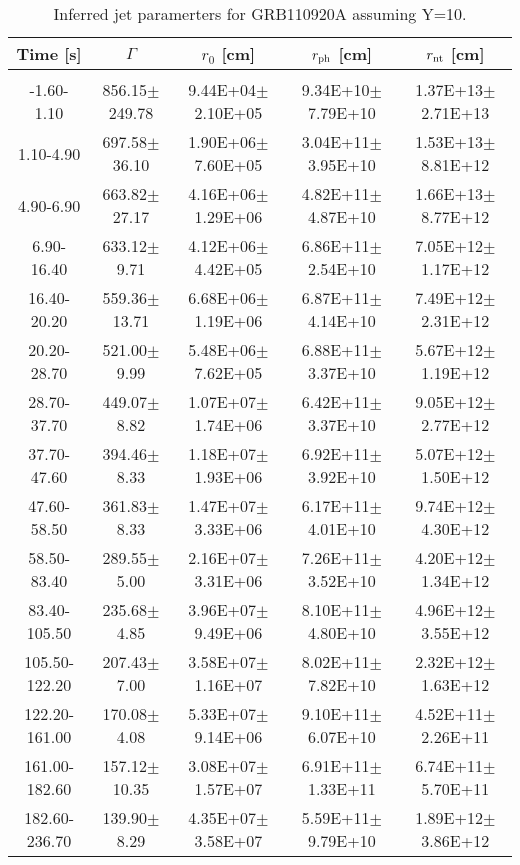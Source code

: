 \begin{table}[htp]
\scriptsize
\label{tab:}
\begin{tabular}{c c c c c}
Time [s] & $\Gamma$ & $r_0$ [cm] & $r_{\rm ph}$ [cm] & $r_{\rm nt}$ [cm] \\
\hline \hline\\ 

-1.60-1.10 & 856.15$\pm$249.78 & 9.44E+04$\pm$2.10E+05 & 9.34E+10$\pm$7.79E+10 & 1.37E+13$\pm$2.71E+13 \\ 

1.10-4.90 & 697.58$\pm$36.10 & 1.90E+06$\pm$7.60E+05 & 3.04E+11$\pm$3.95E+10 & 1.53E+13$\pm$8.81E+12 \\ 

4.90-6.90 & 663.82$\pm$27.17 & 4.16E+06$\pm$1.29E+06 & 4.82E+11$\pm$4.87E+10 & 1.66E+13$\pm$8.77E+12 \\ 

6.90-16.40 & 633.12$\pm$9.71 & 4.12E+06$\pm$4.42E+05 & 6.86E+11$\pm$2.54E+10 & 7.05E+12$\pm$1.17E+12 \\ 

16.40-20.20 & 559.36$\pm$13.71 & 6.68E+06$\pm$1.19E+06 & 6.87E+11$\pm$4.14E+10 & 7.49E+12$\pm$2.31E+12 \\ 

20.20-28.70 & 521.00$\pm$9.99 & 5.48E+06$\pm$7.62E+05 & 6.88E+11$\pm$3.37E+10 & 5.67E+12$\pm$1.19E+12 \\ 

28.70-37.70 & 449.07$\pm$8.82 & 1.07E+07$\pm$1.74E+06 & 6.42E+11$\pm$3.37E+10 & 9.05E+12$\pm$2.77E+12 \\ 

37.70-47.60 & 394.46$\pm$8.33 & 1.18E+07$\pm$1.93E+06 & 6.92E+11$\pm$3.92E+10 & 5.07E+12$\pm$1.50E+12 \\ 

47.60-58.50 & 361.83$\pm$8.33 & 1.47E+07$\pm$3.33E+06 & 6.17E+11$\pm$4.01E+10 & 9.74E+12$\pm$4.30E+12 \\ 

58.50-83.40 & 289.55$\pm$5.00 & 2.16E+07$\pm$3.31E+06 & 7.26E+11$\pm$3.52E+10 & 4.20E+12$\pm$1.34E+12 \\ 

83.40-105.50 & 235.68$\pm$4.85 & 3.96E+07$\pm$9.49E+06 & 8.10E+11$\pm$4.80E+10 & 4.96E+12$\pm$3.55E+12 \\ 

105.50-122.20 & 207.43$\pm$7.00 & 3.58E+07$\pm$1.16E+07 & 8.02E+11$\pm$7.82E+10 & 2.32E+12$\pm$1.63E+12 \\ 

122.20-161.00 & 170.08$\pm$4.08 & 5.33E+07$\pm$9.14E+06 & 9.10E+11$\pm$6.07E+10 & 4.52E+11$\pm$2.26E+11 \\ 

161.00-182.60 & 157.12$\pm$10.35 & 3.08E+07$\pm$1.57E+07 & 6.91E+11$\pm$1.33E+11 & 6.74E+11$\pm$5.70E+11 \\ 

182.60-236.70 & 139.90$\pm$8.29 & 4.35E+07$\pm$3.58E+07 & 5.59E+11$\pm$9.79E+10 & 1.89E+12$\pm$3.86E+12 \\ 

\end{tabular}
\caption{Inferred jet paramerters for GRB110920A assuming Y=10.}
\end{table}
